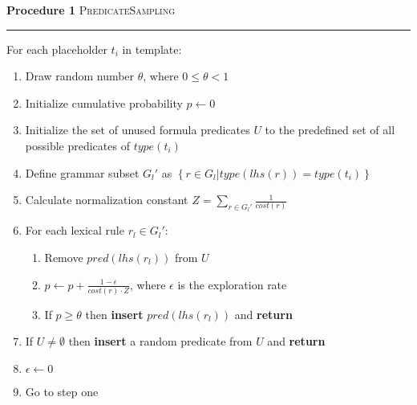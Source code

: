 \documentclass[a4paper]{article}
\begin{document}
\begin{mdframed}
    \textbf{Procedure 1} \textsc{PredicateSampling}\vspace{0.2cm}\hrule\vspace{0.2cm}
\noindent For each placeholder $t_i$ in template:
\begin{enumerate}
    \item Draw random number $\theta$, where $0 \leq \theta < 1$
    \item Initialize cumulative probability $p \gets 0$
    \item Initialize the set of unused formula predicates $U$ to the predefined set of all possible predicates of $type(t_i)$
    \item Define grammar subset $G_l'$ as $\left\{r \in G_l | type(lhs(r)) = type(t_i)\right\}$
    \item Calculate normalization constant $Z = \sum\limits_{r \in G_l'} \frac{1}{cost(r)}$
    \item For each lexical rule $r_l \in G_l'$:
        \begin{enumerate}
            \item Remove $pred(lhs(r_l))$ from $U$
            \item $p \gets p + \frac{1-\epsilon}{cost(r) \cdot Z}$, where $\epsilon$ is the exploration rate
            \item If $p \geq \theta$ then \textbf{insert} $pred(lhs(r_l))$ and \textbf{return}
        \end{enumerate}
    \item If $U \neq \emptyset$ then \textbf{insert} a random predicate from $U$ and \textbf{return}
    \item $\epsilon \gets 0$
    \item Go to step one
\end{enumerate}
\end{mdframed}
\end{document}
